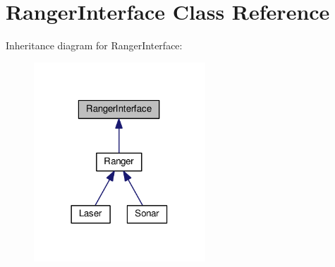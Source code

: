 \hypertarget{classRangerInterface}{}\section{Ranger\+Interface Class Reference}
\label{classRangerInterface}


Inheritance diagram for Ranger\+Interface\+:\nopagebreak
\begin{figure}[H]
\begin{center}
\leavevmode
\includegraphics[width=182pt]{classRangerInterface__inherit__graph}
\end{center}
\end{figure}
